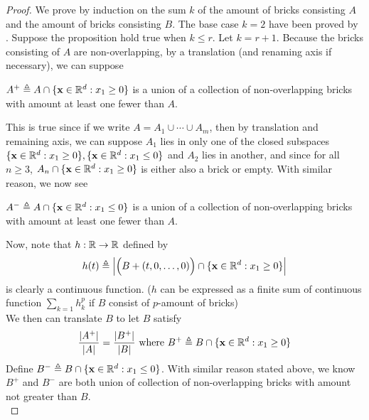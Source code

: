 \documentclass{report}
\begin{document}
\begin{proof}
  We prove by induction on the sum $k$ of the amount of bricks consisting $A$ and the amount of bricks consisting $B$. The base case $k=2$ have been proved by . Suppose the proposition hold true when $k\leq r$. Let $k=r+1$. Because the bricks consisting of $A$ are non-overlapping, by a translation  (and renaming axis if necessary), we can suppose 
\begin{center}
   \begin{minipage}{0.9\linewidth}  
      $A^+\triangleq A\cap \{ \textbf{x}\in\mathbb{R}^d: x_1\geq 0 \}$ is a union of a collection of non-overlapping bricks with amount at least one fewer than $A$. 
   \end{minipage}
\end{center}
This is true since if we write $A=A_1\cup \cdots \cup A_m$, then by translation and remaining axis, we can suppose $A_1$ lies in only one of the closed subspaces $\{ \textbf{x}\in\mathbb{R}^d:x_1\geq 0 \},\{ \textbf{x}\in\mathbb{R}^d:x_1\leq 0 \}$ and $A_2$ lies in another, and since for all $n\geq 3$, $A_n \cap \{ \textbf{x}\in\mathbb{R}^d: x_1\geq 0 \}$ is either also a brick or empty. With similar reason, we now see 
\begin{center}
   \begin{minipage}{0.9\linewidth}  
      $A^-\triangleq A\cap \{ \textbf{x}\in\mathbb{R}^d: x_1\leq 0 \}$ is a union of a collection of non-overlapping bricks with amount at least one fewer than $A$. 
   \end{minipage}
\end{center}
Now, note that $h:\mathbb{R}\rightarrow \mathbb{R}$ defined by
\begin{align*}
h(t)\triangleq  \left|\Big(B+(t,0,\dots ,0) \Big)\cap \{ \textbf{x}\in\mathbb{R}^d: x_1\geq 0 \}\right|
\end{align*}
is clearly a continuous function. ($h$ can be expressed as a finite sum of continuous function $\sum_{k=1}h_k^p$ if $B$ consist of $p$-amount of bricks)\\

We then can translate $B$ to let $B$ satisfy 
 \begin{align}
  \label{rai}
\frac{\left|A^+\right|}{\left|A\right|}= \frac{\left|B^+\right|}{\left|B\right|}\text{ where }B^+ \triangleq B \cap \{ \textbf{x}\in\mathbb{R}^d: x_1\geq 0 \}
\end{align}
Define $B^-\triangleq B\cap \{ \textbf{x}\in\mathbb{R}^d:x_1\leq 0 \}$. With similar reason stated above, we know $B^+$ and  $B^-$ are both union of collection of non-overlapping bricks with amount not greater than  $B$. \\


\end{proof}
\end{document}
